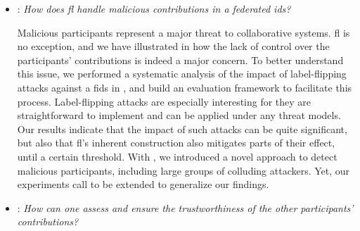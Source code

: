\begin{itemize}[listparindent=\parindent,itemsep=.6\baselineskip]
  We proposed in  a novel approach to address this issue, \texttt{RADAR}, which leverages three components:
  However, because of the lack of appropriate distributed \gls{ids} datasets, we are limited in our evaluation.
  We propose in  an unconventional approach to address this issue, leveraging constraint-based topology composition to generate synthetic datasets that mimic the characteristics of independent organizations.
  Consequently, while we have evidences that \gls{fl} can could be used to federate \glspl{ids} across heterogeneous data sources, this still represents a major research direction.

  
  \item {}: \emph{How does \gls{fl} handle malicious contributions in a federated \gls{ids}?}
  
  Malicious participants represent a major threat to collaborative systems.
  \Gls{fl} is no exception, and we have illustrated in  how the lack of control over the participants' contributions is indeed a major concern.
  To better understand this issue, we performed a systematic analysis of the impact of label-flipping attacks against a \gls{fids} in , and build an evaluation framework to facilitate this process.
  Label-flipping attacks are especially interesting for they are straightforward to implement and can be applied under any threat models.
  Our results indicate that the impact of such attacks can be quite significant, but also that \gls{fl}'s inherent construction also mitigates parts of their effect, until a certain threshold.
  With , we introduced a novel approach to detect malicious participants, including large groups of colluding attackers.
  Yet, our experiments call to be extended to generalize our findings.

  
  \item {}: \emph{How can one assess and ensure the trustworthiness of the other participants' contributions?}
  

\end{itemize}
